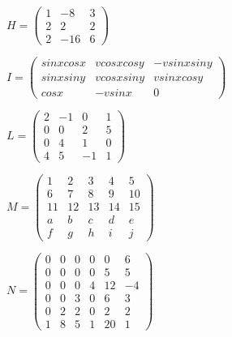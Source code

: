 \documentclass[a4paper,10pt]{article}
\begin{document}

    $ H=  
        \begin{pmatrix} 
            1 & -8 & 3 \\
            2 & 2 & 2 \\
            2 & -16 & 6 
        \end{pmatrix} 
    $


    $ I= 
        \begin{pmatrix} 
            sin{x}cos{x} & vcos{x}cos{y} & -vsin{x}sin{y} \\
            sin{x}sin{y} & vcos{x}sin{y} & vsin{x}cos{y} \\
            cos{x} & -vsin{x} & 0
        \end{pmatrix} 
    $


    $ L=  
        \begin{pmatrix} 
                2 & -1 & 0 & 1 \\
                0 & 0 & 2 & 5 \\
                0 & 4 & 1 & 0 \\
                4 & 5 & -1 & 1  
        \end{pmatrix} 
    $


    $ M= 
        \begin{pmatrix} 
            1 & 2 & 3 & 4 & 5 \\
            6 & 7 & 8 & 9 & 10 \\
            11 & 12 & 13 & 14 & 15 \\
            a & b & c & d & e \\
            f & g & h & i & j
        \end{pmatrix} 
    $


    $ N= 
        \begin{pmatrix} 
            0 & 0 & 0 & 0 & 0 & 6 \\
            0 & 0 & 0 & 0 & 5 & 5 \\
            0 & 0 & 0 & 4 & 12 & -4 \\
            0 & 0 & 3 & 0 & 6 & 3 \\
            0 & 2 & 2 & 0 & 2 & 2 \\
            1 & 8 & 5 & 1 & 20 & 1 
        \end{pmatrix} 
    $
\end{document}
